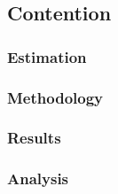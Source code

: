 \subsection{Contention}

\subsubsection{Estimation}

\subsubsection{Methodology}

\subsubsection{Results}

\subsubsection{Analysis}
